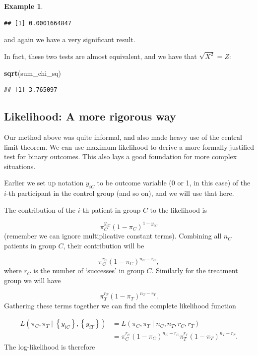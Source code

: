 \documentclass[
  openany]{book}
\newenvironment{Shaded}{\begin{snugshade}}{\end{snugshade}}
\newcommand{\FunctionTok}[1]{\textcolor[rgb]{0.13,0.29,0.53}{\textbf{#1}}}
\newcommand{\NormalTok}[1]{#1}
\theoremstyle{definition}
\theoremstyle{definition}
\newtheorem{example}{Example}[chapter]
\theoremstyle{definition}
\theoremstyle{definition}
\theoremstyle{remark}
\begin{document}
\begin{example}
\begin{verbatim}
## [1] 0.0001664847
\end{verbatim}

and again we have a very significant result.

In fact, these two tests are almost equivalent, and we have that \(\sqrt{X^2} = Z\):

\begin{Shaded}
\begin{Highlighting}[]
\FunctionTok{sqrt}\NormalTok{(sum\_chi\_sq)}
\end{Highlighting}
\end{Shaded}

\begin{verbatim}
## [1] 3.765097
\end{verbatim}

\end{example}

\subsection{Likelihood: A more rigorous way}\label{likelihood-a-more-rigorous-way}

Our method above was quite informal, and also made heavy use of the central limit theorem. We can use maximum likelihood to derive a more formally justified test for binary outcomes. This also lays a good foundation for more complex situations.

Earlier we set up notation \(y_{iC}\) to be outcome variable (0 or 1, in this case) of the \(i\)-th participant in the control group (and so on), and we will use that here.

The contribution of the \(i\)-th patient in group \(C\) to the likelihood is

\[\pi_C^{y_{iC}}\left(1 - \pi_C\right)^{1-y_{iC}} \]
(remember we can ignore multiplicative constant terms). Combining all \(n_C\) patients in group \(C\), their contribution will be

\[ \pi_C^{r_C}\left(1-\pi_C\right)^{n_C - r_C},\]
where \(r_C\) is the number of `successes' in group \(C\). Similarly for the treatment group we will have

\[ \pi_T^{r_T}\left(1-\pi_T\right)^{n_T - r_T}.\]
Gathering these terms together we can find the complete likelihood function

\[
\begin{aligned}
L\left(\pi_C,\pi_T \mid \left\lbrace y_{iC}\right\rbrace, \left\lbrace y_{iT}\right\rbrace \right) & =
  L\left( \pi_C,\pi_T \mid {n_C,n_T, r_C, r_T}\right)\\
  & = \pi_C^{r_C}\left(1-\pi_C\right)^{n_C - r_C}\pi_T^{r_T}\left(1-\pi_T\right)^{n_T - r_T}.
\end{aligned}
\]
The log-likelihood is therefore
\end{document}
